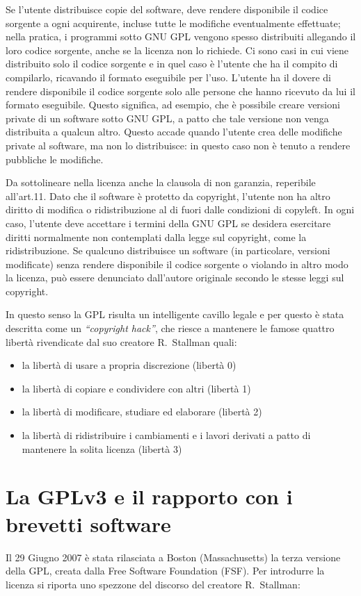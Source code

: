 Se l'utente distribuisce copie del software, deve rendere disponibile il codice sorgente a ogni acquirente, incluse tutte le modifiche eventualmente effettuate; nella pratica, i programmi sotto GNU GPL vengono spesso distribuiti allegando il loro codice sorgente, anche se la licenza non lo richiede. Ci sono casi in cui viene distribuito solo il codice sorgente e in quel caso è l'utente che ha il compito di compilarlo, ricavando il formato eseguibile per l'uso.
L'utente ha il dovere di rendere disponibile il codice sorgente solo alle persone che hanno ricevuto da lui il formato eseguibile. Questo significa, ad esempio, che è possibile creare versioni private di un software sotto GNU GPL, a patto che tale versione non venga distribuita a qualcun altro. Questo accade quando l'utente crea delle modifiche private al software, ma non lo distribuisce: in questo caso non è tenuto a rendere pubbliche le modifiche.

Da sottolineare nella licenza anche la clausola di non garanzia, reperibile all'art.11. Dato che il software è protetto da copyright, l'utente non ha altro diritto di modifica o ridistribuzione al di fuori dalle condizioni di copyleft. In ogni caso, l'utente deve accettare i termini della GNU GPL se desidera esercitare diritti normalmente non contemplati dalla legge sul copyright, come la ridistribuzione. Se qualcuno distribuisce un software (in particolare, versioni modificate) senza rendere disponibile il codice sorgente o violando in altro modo la licenza, può essere denunciato dall'autore originale secondo le stesse leggi sul copyright.

In questo senso la GPL risulta un intelligente cavillo legale e per questo è stata descritta come un \textit{``copyright hack''}, che riesce a mantenere le famose quattro libertà rivendicate dal suo creatore R.~Stallman quali:
\begin{itemize}
\item la libertà di usare a propria discrezione (libertà 0)
\item la libertà di copiare e condividere con altri (libertà 1)
\item la libertà di modificare, studiare ed elaborare (libertà 2)
\item la libertà di ridistribuire i cambiamenti e i lavori derivati a patto di mantenere la solita licenza (libertà 3)
\end{itemize}


\section{La GPLv3 e il rapporto con i brevetti software}
Il 29 Giugno 2007 è stata rilasciata a Boston (Massachusetts) la terza versione della GPL, creata dalla  Free Software Foundation (FSF).
Per introdurre la licenza si riporta uno spezzone del discorso del creatore R.~Stallman:

